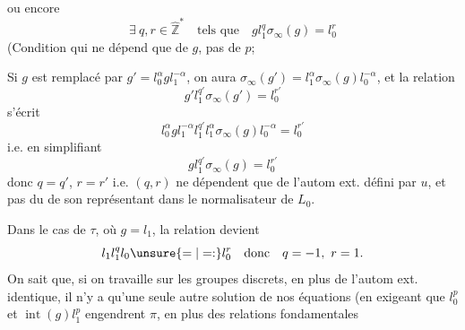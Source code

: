 ou encore
\[
\exists\ q,r\in\hat{\mathbb Z}^{*}\quad\text{tels que}\quad\boxed{gl_1^q\sigma_\infty(g)=l_0^r}
\]
(Condition qui ne dépend que de $g$, pas de $p$;

Si $g$ est remplacé par $g'=l_0^\alpha gl_1^{-\alpha}$, on aura $\sigma_\infty(g')=l_1^\alpha\sigma_\infty(g)l_0^{-\alpha}$, et la relation
\[
g'l_1^{q'}\sigma_\infty(g')=l_0^{r'}
\]
s'écrit
\[
l_0^\alpha gl_1^{-\alpha}l_1^{q'}l_1^\alpha\sigma_\infty(g)l_0^{-\alpha}=l_0^{r'}
\]
i.e. en simplifiant
\[
gl_1^{q'}\sigma_\infty(g)=l_0^{r'}
\]
donc $q=q'$, $r=r'$ i.e. $(q,r)$ ne dépendent que de l'autom ext. défini par $u$, et pas du  de son représentant dans le normalisateur de $L_0$.

Dans le cas de $\tau$, où $g=l_1$, la relation devient
\[
l_1l_1^ql_0\unsure{=|=:}l_0^r\quad\text{donc}\quad q=-1,\ r=1.
\]
On sait que, si on travaille sur les groupes discrets, en plus de l'autom ext. identique, il n'y a qu'une seule autre solution de nos équations (en exigeant  que $l_0^p$ et $\operatorname{int}(g)l_1^p$ engendrent $\pi$, en plus des relations fondamentales
